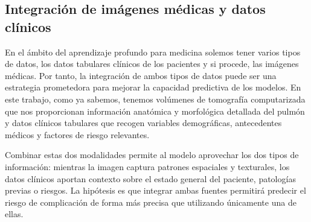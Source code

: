 






\subsection{Integración de imágenes médicas y datos clínicos}

En el ámbito del aprendizaje profundo para medicina solemos tener varios tipos de datos, los datos tabulares clínicos de los pacientes y si procede, las imágenes médicas. Por tanto, la integración de ambos tipos de datos puede ser una estrategia prometedora para mejorar la capacidad predictiva de los modelos. En este trabajo, como ya sabemos, tenemos volúmenes de tomografía computarizada que nos proporcionan información anatómica y morfológica detallada del pulmón y datos clínicos tabulares que recogen variables demográficas, antecedentes médicos y factores de riesgo relevantes.  

Combinar estas dos modalidades permite al modelo aprovechar los dos tipos de información: mientras la imagen captura patrones espaciales y texturales, los datos clínicos aportan contexto sobre el estado general del paciente, patologías previas o riesgos. La hipótesis es que integrar ambas fuentes permitirá predecir el riesgo de complicación de forma más precisa que utilizando únicamente una de ellas.  

